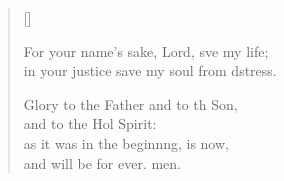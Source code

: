 \begin{verse}[\versewidth]
\begin{patverse}
    For your name’s sake, Lord, sve my life;\Med\\
    in your justice save my soul from d\pointup{\i}stress.

    Glory to the Father and to th Son,\Med\\
    and to the Hol Spirit:\\
    as it was in the beginn\pointup{\i}ng, is now,\Med\\
    and will be for ever. men.
  \end{patverse}
  \end{verse}
